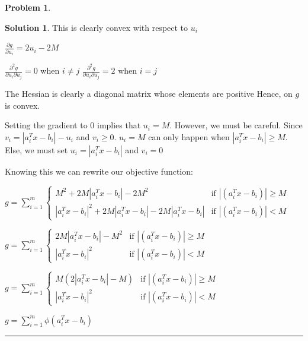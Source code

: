 \documentclass{article}
\theoremstyle{definition}
\newtheorem{problem}{Problem}
\def\fline{\rule{0.75\linewidth}{0.5pt}}
\newcommand{\finishline}{\begin{center}\fline\end{center}}
\newtheorem*{solution*}{Solution}
\newenvironment{solution}{\begin{solution*}}{{\finishline} \end{solution*}}
\begin{document}
\begin{problem}
\begin{solution}
    This is clearly convex with respect to $u_i$ \newline 

    $\frac{\partial g}{\partial u_i} = 2u_i - 2M$

    $\frac{\partial^2 g}{\partial u_i \partial u_j} = 0$ when $i \neq j$ \newline 
    $\frac{\partial^2 g}{\partial u_i \partial u_j} = 2$ when $i = j$

    The Hessian is clearly a diagonal matrix whose elements are positive Hence, on $g$ is convex. 

    Setting the gradient to 0 implies that $u_i = M$. However, we must be careful. Since $v_i = |a_i^T x - b_i| - u_i$ and $v_i \geq 0$. $u_i = M$ can only happen when $|a_i^T x - b_i| \geq M$. Else, we must set $u_i = |a_i^T x - b_i|$ and $v_i = 0$

    Knowing this we can rewrite our objective function: 

$g = \sum_{i=1}^{m} \begin{cases} 
      M^2 + 2M|a_i^T x - b_i| - 2M^2  & \text{if }  |(a_i^T x - b_i)| \geq M \\
      |a_i^T x - b_i|^2 + 2M|a_i^T x - b_i| - 2M|a_i^T x - b_i| & \text{if } |(a_i^T x - b_i)| < M
   \end{cases}$ \newline 

$g = \sum_{i=1}^{m} \begin{cases} 
      2M|a_i^T x - b_i| - M^2  & \text{if }  |(a_i^T x - b_i)| \geq M \\
      |a_i^T x - b_i|^2  & \text{if } |(a_i^T x - b_i)| < M
   \end{cases}$ \newline 

$g = \sum_{i=1}^{m} \begin{cases} 
      M(2|a_i^T x - b_i| - M)  & \text{if }  |(a_i^T x - b_i)| \geq M \\
      |a_i^T x - b_i|^2  & \text{if } |(a_i^T x - b_i)| < M
   \end{cases}$ \newline 

$g = \sum_{i=1}^{m} \phi(a_i^T x - b_i)$ \newline 

\end{solution}
\end{problem}
\end{document}
